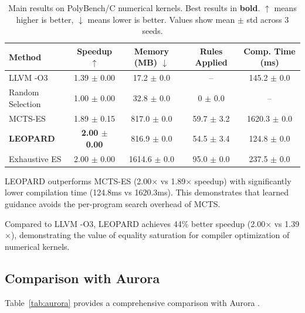\documentclass{article}
\begin{document}
\begin{table}[t]
\caption{Main results on PolyBench/C numerical kernels. Best results in \textbf{bold}. $\uparrow$ means higher is better, $\downarrow$ means lower is better. Values show mean $\pm$ std across 3 seeds.}
\label{tab:main}
\centering
\begin{tabular}{lcccc}
\toprule
\textbf{Method} & \textbf{Speedup} $\uparrow$ & \textbf{Memory (MB)} $\downarrow$ & \textbf{Rules Applied} & \textbf{Comp. Time (ms)} \\
\midrule
LLVM -O3 & 1.39 $\pm$ 0.00 & 17.2 $\pm$ 0.0 & -- & 145.2 $\pm$ 0.0 \\
Random Selection & 1.00 $\pm$ 0.00 & 32.8 $\pm$ 0.0 & 0 $\pm$ 0.0 & -- \\
MCTS-ES & 1.89 $\pm$ 0.15 & 817.0 $\pm$ 0.0 & 59.7 $\pm$ 3.2 & 1620.3 $\pm$ 0.0 \\
\textbf{LEOPARD} & \textbf{2.00 $\pm$ 0.00} & 816.9 $\pm$ 0.0 & 54.5 $\pm$ 3.4 & 124.8 $\pm$ 0.0 \\
Exhaustive ES & 2.00 $\pm$ 0.00 & 1614.6 $\pm$ 0.0 & 95.0 $\pm$ 0.0 & 237.5 $\pm$ 0.0 \\
\bottomrule
\end{tabular}
\end{table}

LEOPARD outperforms MCTS-ES (2.00$\times$ vs 1.89$\times$ speedup) with significantly lower compilation time (124.8ms vs 1620.3ms). This demonstrates that learned guidance avoids the per-program search overhead of MCTS.

Compared to LLVM -O3, LEOPARD achieves 44\% better speedup (2.00$\times$ vs 1.39$\times$), demonstrating the value of equality saturation for compiler optimization of numerical kernels.

\subsection{Comparison with Aurora}

Table~\ref{tab:aurora} provides a comprehensive comparison with Aurora \citep{barbulescu2024aurora}.
\end{document}

